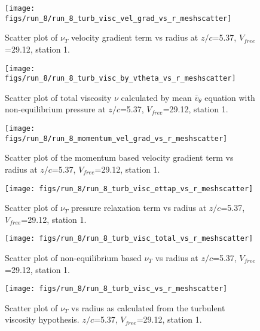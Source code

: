 \begin{figure}[H]
\centering
\texttt{[image: figs/run\_8/run\_8\_turb\_visc\_vel\_grad\_vs\_r\_meshscatter]}
\caption{Scatter plot of $\nu_T$ velocity gradient term vs radius at $z/c$=5.37, $V_{free}$=29.12, station 1.}
\end{figure}


\begin{figure}[H]
\centering
\texttt{[image: figs/run\_8/run\_8\_turb\_visc\_by\_vtheta\_vs\_r\_meshscatter]}
\caption{Scatter plot of total viscosity $\nu$ calculated by mean $\bar{v}_{\theta}$ equation with non-equilibrium pressure at $z/c$=5.37, $V_{free}$=29.12, station 1.}
\end{figure}


\begin{figure}[H]
\centering
\texttt{[image: figs/run\_8/run\_8\_momentum\_vel\_grad\_vs\_r\_meshscatter]}
\caption{Scatter plot of the momentum based velocity gradient term vs radius at $z/c$=5.37, $V_{free}$=29.12, station 1.}
\end{figure}


\begin{figure}[H]
\centering
\texttt{[image: figs/run\_8/run\_8\_turb\_visc\_ettap\_vs\_r\_meshscatter]}
\caption{Scatter plot of $\nu_T$ pressure relaxation term vs radius at $z/c$=5.37, $V_{free}$=29.12, station 1.}
\end{figure}


\begin{figure}[H]
\centering
\texttt{[image: figs/run\_8/run\_8\_turb\_visc\_total\_vs\_r\_meshscatter]}
\caption{Scatter plot of non-equilibrium based $\nu_T$ vs radius at $z/c$=5.37, $V_{free}$=29.12, station 1.}
\end{figure}


\begin{figure}[H]
\centering
\texttt{[image: figs/run\_8/run\_8\_turb\_visc\_vs\_r\_meshscatter]}
\caption{Scatter plot of $\nu_T$ vs radius as calculated from the turbulent viscosity hypothesis. $z/c$=5.37, $V_{free}$=29.12, station 1.}
\end{figure}


